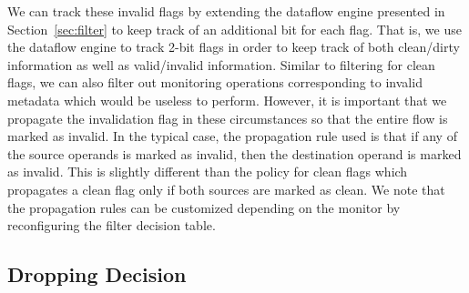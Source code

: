 %     

We can track these invalid flags by extending the dataflow engine presented in
Section~\ref{sec:filter} to keep track of an additional bit for each flag. That
is, we use the dataflow engine to track 2-bit flags in order to keep track of
both clean/dirty information as well as valid/invalid information.
Similar to filtering for clean flags, we can also filter out
monitoring operations corresponding to invalid metadata which would be useless to perform.
However, it is important that we propagate the
invalidation flag in these circumstances so that the entire flow is marked as invalid. 
In the typical case, the propagation rule used is
that if any of the source operands is marked as invalid, then the destination
operand is marked as invalid. This is slightly different than the
policy for clean flags which propagates a clean flag only if both
sources are marked as clean. 
We note that
the propagation rules can be customized depending on the monitor by
reconfiguring the filter decision table.

\subsection{Dropping Decision}
\label{sec:drop.policies}

